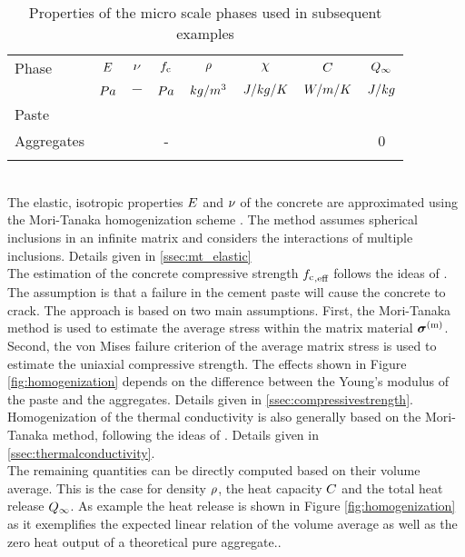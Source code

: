\begin{table}[ht]
	\begin{center}
		\begin{minipage}{.9\textwidth}
			\caption{Properties of the micro scale phases used in subsequent examples}\label{tab:homogenizationproperties}
			\begin{tabular}{lccccccc}
				\toprule
				Phase & $E$ & $\nu$ & $f_{\text{c}}$ & $\rho$ & $\chi$ & $C$ & $Q_{\infty}$\\
				  & $Pa$  & $-$  & $Pa$  & $kg/m^3$  & $J/kg/K$  & $W/m/K$  &  $J/kg$ \\
				\midrule
			Paste	& \pasteE & \pastenu & \pastefc & \pasterho & \pasteC & \pastekappa &  \pasteQ \\
			Aggregates	& \aggregatesE & \aggregatesnu & - & \aggregatesrho & \aggregatesC & \aggregateskappa &  0 \\
				\botrule
			\end{tabular}
		\end{minipage}
	\end{center}
		
\end{table}
\\
The elastic, isotropic properties $E$ and $\nu$ of the concrete are approximated using the Mori-Tanaka homogenization scheme \cite{mor_1973_asi}.
The method assumes spherical inclusions in an infinite matrix and considers the interactions of multiple inclusions. Details given in \ref{ssec:mt_elastic}\\
The estimation of the concrete compressive strength ${f_{\text{c}}}_{,\text{eff}}$ follows the ideas of \cite{nev_2018_mcam}.
The assumption is that a failure in the cement paste will cause the concrete to crack.
The approach is based on two main assumptions.
First, the Mori-Tanaka method is used to estimate the average stress within the matrix material $\boldsymbol{\sigma}^{(\text{m})}$. 
Second, the von Mises failure criterion of the average matrix stress is used to estimate the uniaxial compressive strength.
The effects shown in Figure \ref{fig:homogenization} depends on the difference between the Young's modulus of the paste and the aggregates. Details given in \ref{ssec:compressivestrength}.\\
Homogenization of the thermal conductivity is also generally based on the Mori-Tanaka method, following the ideas of \cite{str_2011_mbeo}. Details given in \ref{ssec:thermalconductivity}.\\
The remaining quantities can be directly computed based on their volume average.
This is the case for density $\rho$, the heat capacity $C$ and the total heat release $Q_{\infty}$.
As example the heat release is shown in Figure \ref{fig:homogenization} as it exemplifies the expected linear relation of the volume average as well as the zero heat output of a theoretical pure aggregate..